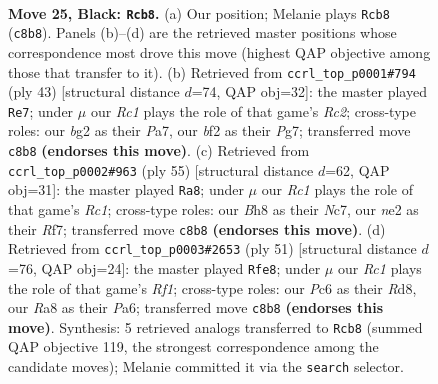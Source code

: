 \documentclass[11pt]{article}
\begin{document}
\clearpage

\begin{figure}[p]\centering
\begin{subfigure}{0.46\textwidth}\centering
\resizebox{\linewidth}{!}{%
\newchessgame
\chessboard[
  setfen={r1r1k1nb/p2n1p1p/P1p3p1/2P1p3/4P2P/5P2/4NBB1/R4RK1 b - - 6 25},
  showmover=false,
  pgfstyle=straightmove, color=movearrow, markmove={c8-b8}
]}
\caption{}
\end{subfigure}\hfill
\begin{subfigure}{0.46\textwidth}\centering
\resizebox{\linewidth}{!}{%
\newchessgame
\chessboard[
  setfen={2k4r/p1r3pp/1p2p3/n1p5/P1P2P1b/2P5/2K1BP1P/2BR3R b - - 1 22},
  showmover=false,
  pgfstyle=straightmove, color=movearrow, markmove={c7-e7}
]}
\caption{}
\end{subfigure}
\\[4pt]
\begin{subfigure}{0.46\textwidth}\centering
\resizebox{\linewidth}{!}{%
\newchessgame
\chessboard[
  setfen={2r3k1/ppn2r1p/2p5/P1Bpbp2/8/1P2P1PP/5PB1/2R2RK1 b - - 2 28},
  showmover=false,
  pgfstyle=straightmove, color=movearrow, markmove={c8-a8}
]}
\caption{}
\end{subfigure}\hfill
\begin{subfigure}{0.46\textwidth}\centering
\resizebox{\linewidth}{!}{%
\newchessgame
\chessboard[
  setfen={3r1rk1/1p3pp1/p1pn3p/4pP2/P7/1PP5/2B2PPP/2R1RK2 b - - 2 26},
  showmover=false,
  pgfstyle=straightmove, color=movearrow, markmove={f8-e8}
]}
\caption{}
\end{subfigure}
\caption{\textbf{Move 25, Black: \texttt{Rcb8}.} (a) Our position; Melanie plays \texttt{Rcb8} (\texttt{c8b8}). Panels (b)--(d) are the retrieved master positions whose correspondence most drove this move (highest QAP objective among those that transfer to it). (b) Retrieved from \texttt{ccrl\_top\_p0001\#794} (ply 43) [structural distance $d$=74, QAP obj=32]: the master played \texttt{Re7}; under $\mu$ our \emph{Rc1} plays the role of that game's \emph{Rc2}; cross-type roles: our \emph{b}g2 as their \emph{P}a7, our \emph{b}f2 as their \emph{P}g7; transferred move \texttt{c8b8} \textbf{(endorses this move)}. (c) Retrieved from \texttt{ccrl\_top\_p0002\#963} (ply 55) [structural distance $d$=62, QAP obj=31]: the master played \texttt{Ra8}; under $\mu$ our \emph{Rc1} plays the role of that game's \emph{Rc1}; cross-type roles: our \emph{B}h8 as their \emph{N}c7, our \emph{n}e2 as their \emph{R}f7; transferred move \texttt{c8b8} \textbf{(endorses this move)}. (d) Retrieved from \texttt{ccrl\_top\_p0003\#2653} (ply 51) [structural distance $d$=76, QAP obj=24]: the master played \texttt{Rfe8}; under $\mu$ our \emph{Rc1} plays the role of that game's \emph{Rf1}; cross-type roles: our \emph{P}c6 as their \emph{R}d8, our \emph{R}a8 as their \emph{P}a6; transferred move \texttt{c8b8} \textbf{(endorses this move)}. Synthesis: 5 retrieved analogs transferred to \texttt{Rcb8} (summed QAP objective 119, the strongest correspondence among the candidate moves); Melanie committed it via the \texttt{search} selector.}
\label{fig:thought-m49}
\end{figure}
\end{document}
